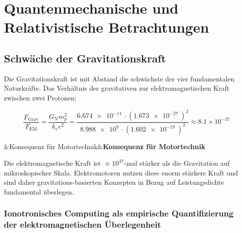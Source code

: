 ﻿\documentclass[12pt, a4paper]{report}
\newenvironment{hinweis}[1][]{%
  \begin{hinweisframe}\sloppy%
  \ifx&#1&\else\textbf{#1}\par\smallskip\fi}{\end{hinweisframe}}
\theoremstyle{definition}
\theoremstyle{remark}
\newcommand{\G}{G_{\text{N}}}          %
\begin{document}
\chapter{Quantenmechanische und Relativistische Betrachtungen}
\label{sec:quanten}

\section{Schwäche der Gravitationskraft}

Die Gravitationskraft ist mit Abstand die schwächste der vier fundamentalen
Naturkräfte. Das Verhältnis der gravitativen zur elektromagnetischen Kraft
zwischen zwei Protonen:

\begin{equation}
  \frac{F_{\text{Grav}}}{F_{\text{EM}}}
  = \frac{\G m_p^2}{k_e e^2}
  = \frac{\SI{6.674e-11}{} \cdot (\SI{1.673e-27}{})^2}{\SI{8.988e9}{} \cdot (\SI{1.602e-19}{})^2}
  \approx 8.1 \times 10^{-37}
  \label{eq:kraft_verhaeltnis}
\end{equation}

\begin{hinweis}[Konsequenz für Motortechnik]
  Die elektromagnetische Kraft ist $\approx 10^{37}$-mal stärker als die
  Gravitation auf mikroskopischer Skala. Elektromotoren nutzen diese enorm
  stärkere Kraft und sind daher gravitations-basierten Konzepten in Bezug
  auf Leistungsdichte fundamental überlegen.
\end{hinweis}

\subsection[Ionotronisches Computing als empirische Quantifizierung]{Ionotronisches Computing als empirische Quantifizierung\\[2pt]
            der elektromagnetischen Überlegenheit}
\label{ssec:iofet_em_ueberlegenheit}
\end{document}
